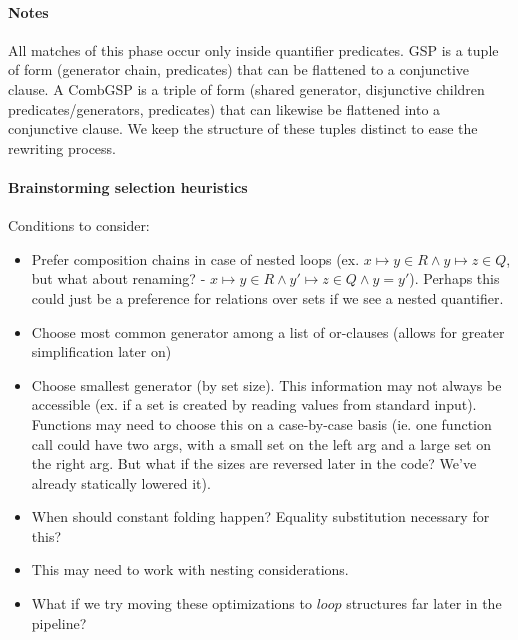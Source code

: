 \paragraph{Notes} All matches of this phase occur only inside quantifier predicates. GSP is a tuple of form (generator chain, predicates) that can be flattened to a conjunctive clause. A CombGSP is a triple of form (shared generator, disjunctive children predicates/generators, predicates) that can likewise be flattened into a conjunctive clause. We keep the structure of these tuples distinct to ease the rewriting process.

\paragraph{Brainstorming selection heuristics}
Conditions to consider:
\begin{itemize}
  \item Prefer composition chains in case of nested loops (ex. $x \mapsto y \in R \land y \mapsto z \in Q$, but what about renaming? - $x \mapsto y \in R \land y' \mapsto z \in Q \land y = y'$). Perhaps this could just be a preference for relations over sets if we see a nested quantifier.
  \item Choose most common generator among a list of or-clauses (allows for greater simplification later on)
  \item Choose smallest generator (by set size). This information may not always be accessible (ex. if a set is created by reading values from standard input). Functions may need to choose this on a case-by-case basis (ie. one function call could have two args, with a small set on the left arg and a large set on the right arg. But what if the sizes are reversed later in the code? We've already statically lowered it).
  \item When should constant folding happen? Equality substitution necessary for this?
  \item This may need to work with nesting considerations.
  \item What if we try moving these optimizations to $loop$ structures far later in the pipeline?
\end{itemize}

